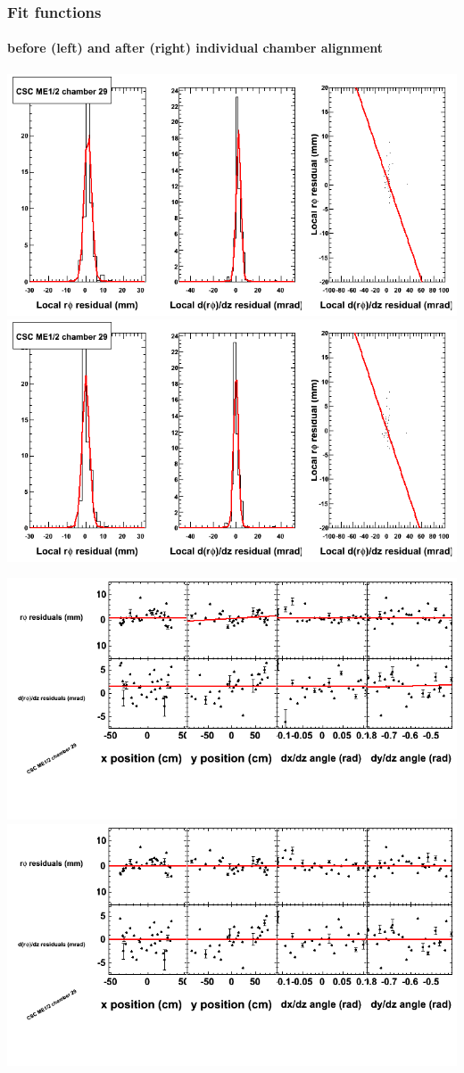 \documentclass[compress]{beamer}
\begin{document}
\begin{frame}
\frametitle{Fit functions}
\framesubtitle{before (left) and after (right) individual chamber alignment}
\includegraphics[width=0.5\linewidth]{ringfits_3dof/beforefit_MEp12_29_bellcurve.png} \includegraphics[width=0.5\linewidth]{ringfits_3dof/afterfit_MEp12_29_bellcurve.png}

\includegraphics[width=0.5\linewidth]{ringfits_3dof/beforefit_MEp12_29_polynomials.png} \includegraphics[width=0.5\linewidth]{ringfits_3dof/afterfit_MEp12_29_polynomials.png}
\end{frame}
\end{document}
